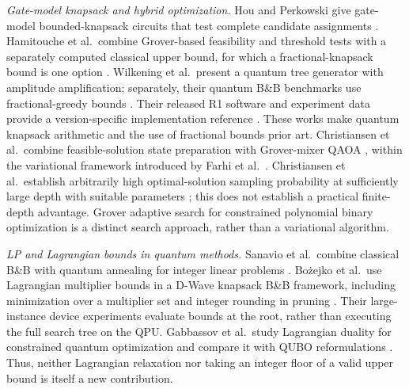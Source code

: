 \documentclass[referee,pdflatex,sn-mathphys-num]{sn-jnl}
\theoremstyle{thmstyleone}
\theoremstyle{thmstyletwo}
\begin{document}
\textit{Gate-model knapsack and hybrid optimization.} Hou and Perkowski give gate-model bounded-knapsack circuits that test complete candidate assignments \cite{hou2020}. Hamitouche et al.\ combine Grover-based feasibility and threshold tests with a separately computed classical upper bound, for which a fractional-knapsack bound is one option \cite{hamitouche2025}. Wilkening et al.\ present a quantum tree generator with amplitude amplification; separately, their quantum B\&B benchmarks use fractional-greedy bounds \cite{wilkening2025}. Their released R1 software and experiment data provide a version-specific implementation reference \cite{wilkening2025code}. These works make quantum knapsack arithmetic and the use of fractional bounds prior art. Christiansen et al.\ combine feasible-solution state preparation with Grover-mixer QAOA \cite{ref23}, within the variational framework introduced by Farhi et al.\ \cite{ref25}. Christiansen et al.\ establish arbitrarily high optimal-solution sampling probability at sufficiently large depth with suitable parameters \cite{ref23}; this does not establish a practical finite-depth advantage. Grover adaptive search for constrained polynomial binary optimization \cite{ref26} is a distinct search approach, rather than a variational algorithm.

\textit{LP and Lagrangian bounds in quantum methods.} Sanavio et al.\ combine classical B\&B with quantum annealing for integer linear problems \cite{ref36}. Bo\.{z}ejko et al.\ use Lagrangian multiplier bounds in a D-Wave knapsack B\&B framework, including minimization over a multiplier set and integer rounding in pruning \cite{bozejko2026}. Their large-instance device experiments evaluate bounds at the root, rather than executing the full search tree on the QPU. Gabbassov et al.\ study Lagrangian duality for constrained quantum optimization and compare it with QUBO reformulations \cite{gabbassov2025}. Thus, neither Lagrangian relaxation nor taking an integer floor of a valid upper bound is itself a new contribution.
\end{document}
